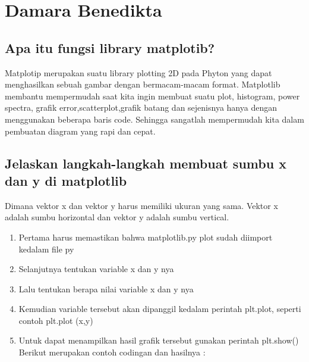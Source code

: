\section{Damara Benedikta}
\subsection {Apa itu fungsi library matplotib?}
Matplotip merupakan suatu library plotting 2D pada Phyton yang dapat menghasilkan sebuah gambar dengan bermacam-macam format. Matplotlib membantu mempermudah saat kita ingin membuat suatu plot, histogram, power spectra, grafik error,scatterplot,grafik batang dan sejenisnya hanya dengan menggunakan beberapa baris code. Sehingga sangatlah mempermudah kita dalam pembuatan diagram yang rapi dan cepat.
\subsection {Jelaskan langkah-langkah membuat sumbu x dan y di matplotlib}
Dimana vektor x dan vektor y harus memiliki ukuran yang sama. Vektor x adalah sumbu horizontal dan vektor y adalah sumbu vertical. 
\begin{enumerate}
	\item Pertama harus memastikan bahwa matplotlib.py plot sudah diimport kedalam file py
	\item Selanjutnya tentukan variable x dan y nya 
	\item Lalu tentukan berapa nilai variable x dan y nya 
	\item Kemudian variable tersebut akan dipanggil kedalam perintah plt.plot, seperti contoh plt.plot (x,y)
	\item Untuk dapat menampilkan hasil grafik tersebut gunakan perintah plt.show()
Berikut merupakan contoh codingan dan hasilnya : 



\end{enumerate}
